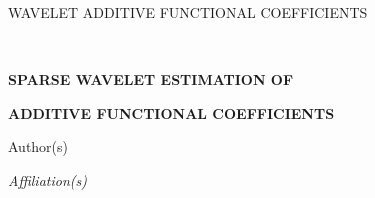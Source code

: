 \documentclass[12pt]{article} %
\theoremstyle{definition}
\begin{document}
\renewcommand{\baselinestretch}{2}


{\hfill {\footnotesize\rm WAVELET ADDITIVE FUNCTIONAL COEFFICIENTS} \hfill}

\renewcommand{\thefootnote}{}
$\ $\par


\fontsize{12}{14pt plus.8pt minus .6pt}\selectfont \vspace{0.8pc}
\centerline{\large\bf SPARSE WAVELET ESTIMATION OF}
\vspace{2pt}
\centerline{\large\bf ADDITIVE FUNCTIONAL COEFFICIENTS}
\vspace{.4cm}
\centerline{Author(s)}
\vspace{.4cm}
\centerline{\it Affiliation(s)}
\vspace{.55cm} \fontsize{9}{11.5pt plus.8pt minus.6pt}\selectfont

\end{document}
